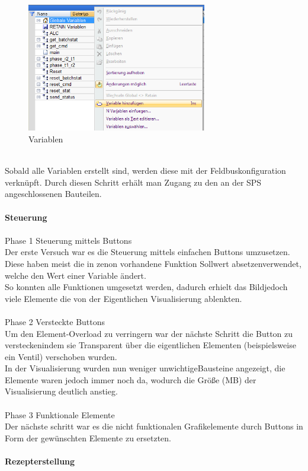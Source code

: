 \begin{figure}[h!]
  \centering
  \includegraphics[width=0.7\textwidth]{graphics/implementation/Variablen}
  \caption{Variablen}%
\end{figure}\\
Sobald alle Variablen erstellt sind, werden diese mit der Feldbuskonfiguration verknüpft. Durch diesen Schritt erhält man Zugang zu den an der SPS angeschlossenen Bauteilen.\\
\\

\textbf{Steuerung}\\
\\
Phase 1 Steuerung mittels Buttons\\
	Der erste Versuch war es die Steuerung mittels einfachen Buttons umzusetzen. Diese haben meist die in zenon vorhandene Funktion  \glqq Sollwert absetzen\grqq\space  verwendet, welche den Wert einer Variable ändert.\\
	So konnten alle Funktionen umgesetzt werden, dadurch erhielt das  \glqq Bild\grqq\space  jedoch viele Elemente die von der Eigentlichen Visualisierung ablenkten.\\
\\
Phase 2 Versteckte Buttons\\
	Um den Element-Overload zu verringern war der nächste Schritt die Button zu  \glqq verstecken\grqq\space  indem sie Transparent über die eigentlichen Elementen (beispielsweise ein Ventil) verschoben wurden.\\
	In der Visualisierung wurden nun weniger  \glqq unwichtige\grqq\space  Bausteine angezeigt, die Elemente waren jedoch immer noch da, wodurch die Größe (MB) der Visualisierung deutlich anstieg.\\
\\
Phase 3 Funktionale Elemente\\
	Der nächste schritt war es die nicht funktionalen Grafikelemente durch Buttons in Form der gewünschten Elemente zu ersetzten.\\
\\
\textbf{Rezepterstellung}\\


